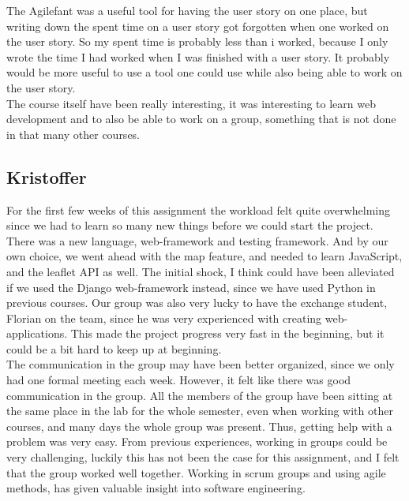 \documentclass[a4paper]{article}
\begin{document}
\noindent
The Agilefant was a useful tool for having the user story on one place, but writing down the spent time on a user story got forgotten when one worked on the user story. So my spent time is probably less than i worked, because I only wrote the time I had worked when I was finished with a user story. It probably would be more useful to use a tool one could use while also being able to work on the user story. \\

\noindent
The course itself have been really interesting, it was interesting to learn web development and to  also be able to work on a group, something that is not done in that many other courses.

\subsection{Kristoffer}
\noindent
For the first few weeks of this assignment the workload felt quite overwhelming since we had to learn so many new things before we could start the project. There was a new language, web-framework and testing framework. And by our own choice, we went ahead with the map feature, and needed to learn JavaScript, and the leaflet API as well.  
The initial shock, I think could have been alleviated if we used the Django web-framework instead, since we have used Python in previous courses.
Our group was also very lucky to have the exchange student, Florian on the team, since he was very experienced with creating web-applications. This made the project progress very fast in the beginning, but it could be a bit hard to keep up at beginning. \\

\noindent
The communication in the group may have been better organized, since we only had one formal meeting each week. However, it felt like there was good communication in the group. All the members of the group have been sitting at the same place in the lab for the whole semester, even when working with other courses, and many days the whole group was present. Thus, getting help with a problem was very easy.
From previous experiences, working in groups could be very challenging, luckily this has not been the case for this assignment, and I felt that the group worked well together. Working in scrum groups and using agile methods, has given valuable insight into software engineering.  \\
\end{document}
